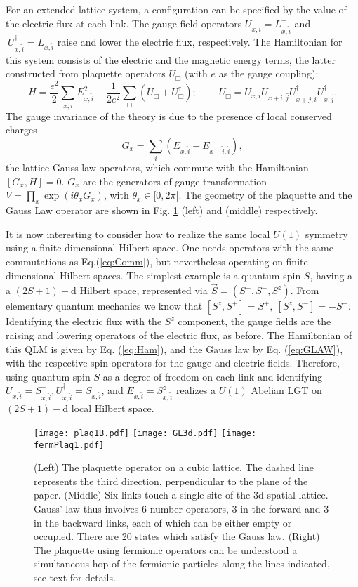 \documentclass[a4paper,11pt]{article}
\begin{document}
 For an extended lattice system, a configuration can be specified by the value of the electric flux at each 
 link. The gauge field operators $U_{x,\hat{i}} = L_{x,\hat{i}}^+$ and $~U_{x,\hat{i}}^\dagger = L_{x,\hat{i}}^-$ raise and lower the electric flux, respectively. The Hamiltonian for this system 
consists of the electric and the magnetic energy terms, the latter constructed from plaquette operators $U_\Box$
(with $e$ as the gauge coupling):
\begin{equation}
 H = \frac{e^2}{2} \sum_{x,i} E_{x,\hat{i}}^2 - \frac{1}{2 e^2} \sum_{\Box} (U_{\Box} + U^\dagger_{\Box});~~~~~~~~~~
 U_{\Box} = U_{x,i} U_{x+\hat{i},\hat{j}} U^\dagger_{x+\hat{j},\hat{i}} U^\dagger_{x,\hat{j}}.
\label{eq:Ham}
\end{equation}
The gauge invariance of the theory is due to the presence of local conserved charges
\begin{equation}
G_x = \sum_{i}(E_{x,\hat{i}} - E_{x-\hat{i},\hat{i}}), 
\label{eq:GLAW}
\end{equation}
the lattice Gauss law operators, which commute with the Hamiltonian $[G_x, H] = 0$. $G_x$ are the generators 
of gauge transformation $V = \prod_{x} \exp (i \theta_x G_x)$, with $\theta_x \in [0, 2\pi[$. The geometry
of the plaquette and the Gauss Law operator are shown in Fig. \ref{fig:plaq} (left) and (middle) respectively.  

  It is now interesting to consider how to realize the same local $U(1)$ symmetry using a finite-dimensional 
Hilbert space. One needs operators with the same commutations as Eq.(\ref{eq:Comm}), but nevertheless operating
on finite-dimensional Hilbert spaces. The simplest example is a quantum spin-$S$, having a a $(2 S + 1 )-$d 
Hilbert space, represented via $\vec{S} = (S^+, S^-, S^z)$. From elementary 
quantum mechanics we know that $[S^z , S^+] = S^+,~ [S^z , S^-] = -S^-$. Identifying the electric flux with the
$S^z$ component, the gauge fields are the raising and lowering operators of 
the electric flux, as before. The Hamiltonian of this QLM is given by Eq. (\ref{eq:Ham}), and the Gauss 
law by Eq. (\ref{eq:GLAW}), with the respective spin operators for the gauge and electric fields. 
Therefore, using quantum spin-$S$ as a degree of freedom on each link and identifying $U_{x,\hat{i}}=S^+_{x,\hat{i}},  
U^\dagger_{x,\hat{i}}=S^-_{x,\hat{i}}$, and $E_{x,\hat{i}} = S^z_{x,\hat{i}}$ realizes a $U(1)$ Abelian LGT
on $(2S+1)-$d local Hilbert space.

\begin{figure}[!tbh]
 \texttt{[image: plaq1B.pdf]}
 \texttt{[image: GL3d.pdf]}
 \texttt{[image: fermPlaq1.pdf]}
 \caption{(Left) The plaquette operator on a cubic lattice. The dashed line represents the
third direction, perpendicular to the plane of the paper. (Middle) Six links touch a single site of the 3d
spatial lattice. Gauss' law thus involves 6 number operators, 3 in the forward and 3 in the backward links, 
each of which can be either empty or occupied. There are 20 states which satisfy the Gauss law.
(Right) The plaquette using fermionic operators can be understood a simultaneous hop of the
fermionic particles along the lines indicated, see text for details.}
 \label{fig:plaq}
\end{figure}
\end{document}
